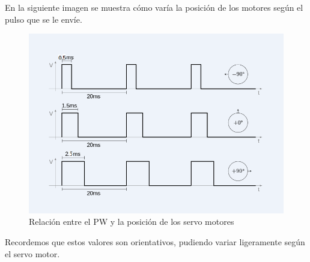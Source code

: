 \documentclass[twoside, 12pt]{epstfg}
\begin{document}
En la siguiente imagen se muestra cómo varía la posición de los motores según el pulso que se le envíe.

\begin{figure}[h!]
	\centerline{
		\mbox{\includegraphics[width=.80\textwidth]{images/PWMServos.png}}
	}
	\caption{Relación entre el PW y la posición de los servo motores}
	\label{figPWM}
\end{figure}

Recordemos que estos valores son orientativos, pudiendo variar ligeramente según el servo motor.

%
%
%
%
%
%
%
%
\end{document}
